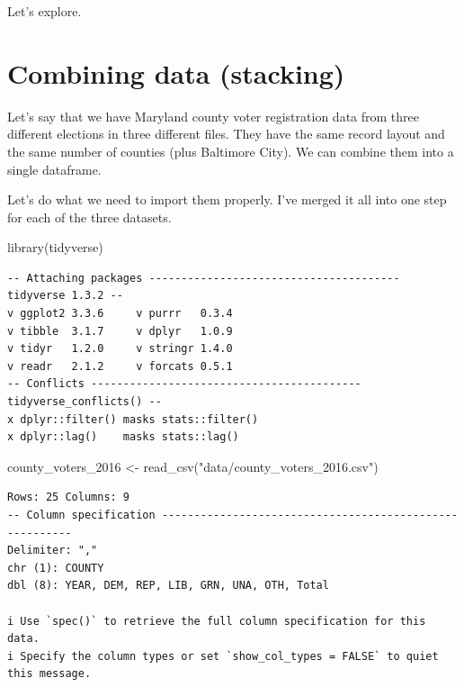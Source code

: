 \documentclass[
  letterpaper,
  DIV=11,
  numbers=noendperiod]{scrreprt}
\newenvironment{Shaded}{\begin{snugshade}}{\end{snugshade}}
\newcommand{\FunctionTok}[1]{\textcolor[rgb]{0.28,0.35,0.67}{#1}}
\newcommand{\NormalTok}[1]{\textcolor[rgb]{0.00,0.23,0.31}{#1}}
\newcommand{\OtherTok}[1]{\textcolor[rgb]{0.00,0.23,0.31}{#1}}
\newcommand{\StringTok}[1]{\textcolor[rgb]{0.13,0.47,0.30}{#1}}
\begin{document}
Let's explore.

\hypertarget{combining-data-stacking}{%
\section{Combining data (stacking)}\label{combining-data-stacking}}

Let's say that we have Maryland county voter registration data from
three different elections in three different files. They have the same
record layout and the same number of counties (plus Baltimore City). We
can combine them into a single dataframe.

Let's do what we need to import them properly. I've merged it all into
one step for each of the three datasets.

\begin{Shaded}
\begin{Highlighting}[]
\FunctionTok{library}\NormalTok{(tidyverse)}
\end{Highlighting}
\end{Shaded}

\begin{verbatim}
-- Attaching packages --------------------------------------- tidyverse 1.3.2 --
v ggplot2 3.3.6     v purrr   0.3.4
v tibble  3.1.7     v dplyr   1.0.9
v tidyr   1.2.0     v stringr 1.4.0
v readr   2.1.2     v forcats 0.5.1
-- Conflicts ------------------------------------------ tidyverse_conflicts() --
x dplyr::filter() masks stats::filter()
x dplyr::lag()    masks stats::lag()
\end{verbatim}

\begin{Shaded}
\begin{Highlighting}[]
\NormalTok{county\_voters\_2016 }\OtherTok{\textless{}{-}} \FunctionTok{read\_csv}\NormalTok{(}\StringTok{"data/county\_voters\_2016.csv"}\NormalTok{)}
\end{Highlighting}
\end{Shaded}

\begin{verbatim}
Rows: 25 Columns: 9
-- Column specification --------------------------------------------------------
Delimiter: ","
chr (1): COUNTY
dbl (8): YEAR, DEM, REP, LIB, GRN, UNA, OTH, Total

i Use `spec()` to retrieve the full column specification for this data.
i Specify the column types or set `show_col_types = FALSE` to quiet this message.
\end{verbatim}
\end{document}
